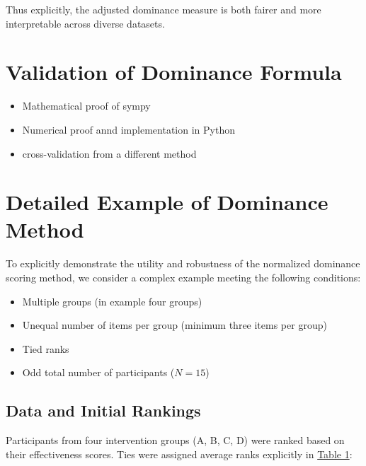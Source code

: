 \documentclass[man,floatsintext]{apa7}
\begin{document}
Thus explicitly, the adjusted dominance measure is both fairer and more interpretable across diverse datasets.

\section{Validation of Dominance Formula}
\begin{itemize}
    \item Mathematical proof of sympy
    \item Numerical proof annd implementation in Python 
    \item cross-validation from a different method
\end{itemize}

\section{Detailed Example of Dominance Method}

To explicitly demonstrate the utility and robustness of the normalized dominance scoring method, we consider a complex example meeting the following conditions:
\begin{itemize}
    \item Multiple groups (in example four groups)
    \item Unequal number of items per group (minimum three items per group)
    \item Tied ranks
    \item Odd total number of participants ($N=15$)
\end{itemize}

\subsection{Data and Initial Rankings}

Participants from four intervention groups (A, B, C, D) were ranked based on their effectiveness scores. Ties were assigned average ranks explicitly in \hyperref[initial-data]{Table 1}:
\end{document}
